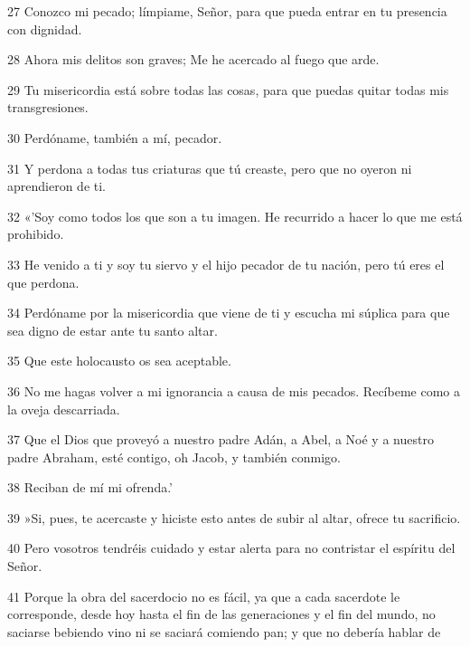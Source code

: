 \par 27 Conozco mi pecado; límpiame, Señor, para que pueda entrar en tu presencia con dignidad.

\par 28 Ahora mis delitos son graves; Me he acercado al fuego que arde.

\par 29 Tu misericordia está sobre todas las cosas, para que puedas quitar todas mis transgresiones.

\par 30 Perdóname, también a mí, pecador.

\par 31 Y perdona a todas tus criaturas que tú creaste, pero que no oyeron ni aprendieron de ti.

\par 32 «'Soy como todos los que son a tu imagen. He recurrido a hacer lo que me está prohibido.

\par 33 He venido a ti y soy tu siervo y el hijo pecador de tu nación, pero tú eres el que perdona.

\par 34 Perdóname por la misericordia que viene de ti y escucha mi súplica para que sea digno de estar ante tu santo altar.

\par 35 Que este holocausto os sea aceptable.

\par 36 No me hagas volver a mi ignorancia a causa de mis pecados. Recíbeme como a la oveja descarriada.

\par 37 Que el Dios que proveyó a nuestro padre Adán, a Abel, a Noé y a nuestro padre Abraham, esté contigo, oh Jacob, y también conmigo.

\par 38 Reciban de mí mi ofrenda.'

\par 39 »Si, pues, te acercaste y hiciste esto antes de subir al altar, ofrece tu sacrificio.

\par 40 Pero vosotros tendréis cuidado y estar alerta para no contristar el espíritu del Señor.

\par 41 Porque la obra del sacerdocio no es fácil, ya que a cada sacerdote le corresponde, desde hoy hasta el fin de las generaciones y el fin del mundo, no saciarse bebiendo vino ni se saciará comiendo pan; y que no debería hablar de

